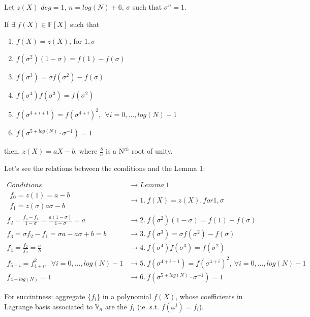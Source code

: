 \documentclass{article}
\theoremstyle{definition}
\newenvironment{lemma}[1]
{\renewcommand\theinnerlemma{#1}\innerlemma}
{\endinnerlemma}
\begin{document}
\begin{lemma}{1}
	Let $z(X)$ $deg=1$, $n=log(N)+6$, $\sigma$ such that $\sigma^n =1$.

	If $\exists$ $f(X) \in \mathbb{F}[X]$ such that
	\begin{enumerate}[1.]
		\item $f(X) = z(X)$, for $1, \sigma$
		\item $f(\sigma^2)(1-\sigma)=f(1)-f(\sigma)$
		\item $f(\sigma^3)=\sigma f(\sigma^2)-f(\sigma)$
		\item $f(\sigma^4)f(\sigma^3)=f(\sigma^2)$
		\item $f(\sigma^{4+i+1})=f(\sigma^{4+i})^2,~~\forall i= 0, \ldots, log(N)-1$
		\item $f(\sigma^{5+log(N)} \cdot \sigma^{-1})=1$
	\end{enumerate}
	then, $z(X)=aX-b$, where $\frac{b}{a}$ is a N$^{th}$ root of unity.
\end{lemma}

Let's see the relations between the conditions and the Lemma 1:
\begin{scriptsize}
\begin{align*}
	Conditions &\longrightarrow Lemma~1\\
	\begin{array}{l}
		f_0 = z(1) = a - b\\ f_1 = z(\sigma) a \sigma -b
	\end{array} &\longrightarrow 1.~f(X) = z(X), for 1, \sigma\\
	f_2 = \frac{f_0 - f_1}{1 - \sigma} = \frac{a(1-\sigma)}{1-\sigma} = a &\longrightarrow 2.~f(\sigma^2)(1-\sigma)=f(1)-f(\sigma)\\
	f_3 = \sigma f_2 - f_1 = \sigma a - a \sigma + b = b &\longrightarrow 3.~f(\sigma^3)=\sigma f(\sigma^2)-f(\sigma)\\
	f_4 = \frac{f_2}{f_3} = \frac{a}{b} &\longrightarrow 4.~f(\sigma^4)f(\sigma^3)=f(\sigma^2)\\
	f_{5+i} = f_{4+i}^2,~~\forall i=0, \ldots, log(N)-1 &\longrightarrow 5.~f(\sigma^{4+i+1})=f(\sigma^{4+i})^2,~\forall i= 0, \ldots, log(N)-1\\
	f_{4+log(N)} = 1 &\longrightarrow 6.~f(\sigma^{5+log(N)} \cdot \sigma^{-1})=1
\end{align*}
\end{scriptsize}


For succintness: aggregate $\{f_i\}$ in a polynomial $f(X)$, whose coefficients in Lagrange basis associated to $\mathbb{V}_n$ are the $f_i$ (ie. s.t. $f(\omega^i)=f_i$).
\end{document}
